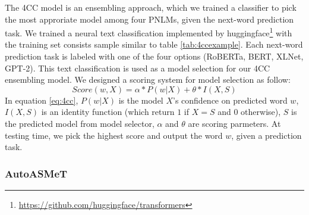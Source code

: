 \documentclass[11pt]{article}
\begin{document}
The 4CC model is an ensembling approach, which we trained a classifier to pick the most approriate model among four PNLMs, given the next-word prediction task. We trained a neural text classification implemented by huggingface\footnote{\url{https://github.com/huggingface/transformers}} with the training set consists sample similar to table \ref{tab:4ccexample}. Each next-word prediction task is labeled with one of the four options (RoBERTa, BERT, XLNet, GPT-2). This text classification is used as a model selection for our 4CC ensembling model. We designed a scoring system for model selection as follow:
\begin{equation} \label{eq:4cc}
	Score(w, X) = \alpha * P(w|X) + \theta * I (X, S)
\end{equation}
In equation \ref{eq:4cc}, $P(w|X)$ is the model $X$'s confidence on predicted word $w$, $I(X, S)$ is an identity function (which return $1$ if $X = S$ and $0$ otherwise), $S$ is the predicted model from model selector, $\alpha$ and $\theta$ are scoring parmeters.  
At testing time, we pick the highest score and output the word $w$, given a prediction task.  

\begin{table}
    \centering
    \caption{An example of tranining data for the 4CC model. Class can be one of the four option: RoBERTa, BERT, XLNet, GPT-2}
    \label{tab:4ccexample}
\end{table}

\subsubsection{AutoASMeT}
\end{document}
